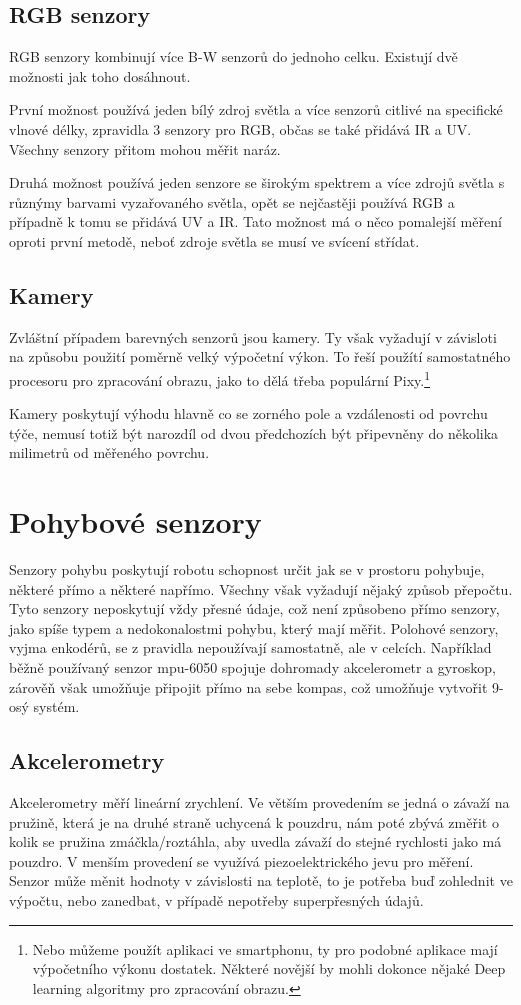 \subsection{RGB senzory}
RGB senzory kombinují více B-W senzorů do jednoho celku.
Existují dvě možnosti jak toho dosáhnout. 

První možnost používá jeden bílý zdroj světla a více senzorů citlivé na specifické vlnové délky, zpravidla 3 senzory pro RGB, občas se také přidává IR a UV.
Všechny senzory přitom mohou měřit naráz.

Druhá možnost používá jeden senzore se širokým spektrem a více zdrojů světla s různýmy barvami vyzařovaného světla, opět se nejčastěji používá RGB a případně k tomu se přidává UV a IR.
Tato možnost má o něco pomalejší měření oproti první metodě, neboť zdroje světla se musí ve svícení střídat.

\subsection{Kamery}
Zvláštní případem barevných senzorů jsou kamery.
Ty však vyžadují v závisloti na způsobu použití poměrně velký výpočetní výkon.
To řeší použítí samostatného procesoru pro zpracování obrazu, jako to dělá třeba populární Pixy.\footnote{Nebo můžeme použít aplikaci ve smartphonu, ty pro podobné aplikace mají výpočetního výkonu dostatek. Některé novější by mohli dokonce nějaké Deep learning algoritmy pro zpracování obrazu.}

Kamery poskytují výhodu hlavně co se zorného pole a vzdálenosti od povrchu týče, nemusí totiž být narozdíl od dvou předchozích být připevněny do několika milimetrů od měřeného povrchu.

\section{Pohybové senzory} 
Senzory pohybu poskytují robotu schopnost určit jak se v prostoru pohybuje, některé přímo a některé napřímo.
Všechny však vyžadují nějaký způsob přepočtu.
Tyto senzory neposkytují vždy přesné údaje, což není způsobeno přímo senzory, jako spíše typem a nedokonalostmi pohybu, který mají měřit.
Polohové senzory, vyjma enkodérů, se z pravidla nepoužívají samostatně, ale v celcích.
Například běžně používaný senzor mpu-6050 spojuje dohromady akcelerometr a gyroskop, zárověň však umožňuje připojit přímo na sebe kompas, což umožňuje vytvořit 9-osý systém.


\subsection{Akcelerometry}
Akcelerometry měří lineární zrychlení. Ve větším provedením se jedná o závaží na pružině, která je na druhé straně uchycená k pouzdru, nám poté zbývá změřit o kolik se pružina zmáčkla/roztáhla, aby uvedla závaží do stejné rychlosti jako má pouzdro.
V menším provedení se využívá piezoelektrického jevu pro měření.
Senzor může měnit hodnoty v závislosti na teplotě, to je potřeba buď zohlednit ve výpočtu, nebo zanedbat, v případě nepotřeby superpřesných údajů. 
\cite{accel}

